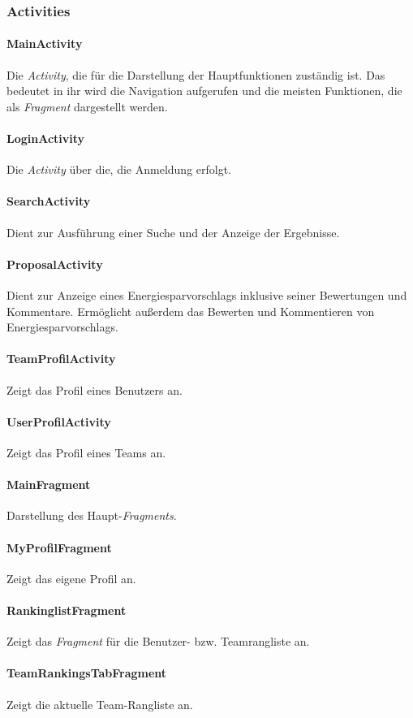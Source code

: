 \subsubsection{Activities}
\paragraph{MainActivity} Die \emph{Activity}, die für die Darstellung der Hauptfunktionen zuständig ist. Das bedeutet in ihr wird die Navigation aufgerufen und die meisten Funktionen, die als \emph{Fragment} dargestellt werden.
\paragraph{LoginActivity} Die \emph{Activity} über die, die Anmeldung erfolgt.
\paragraph{SearchActivity} Dient zur Ausführung einer Suche und der Anzeige der Ergebnisse.
\paragraph{ProposalActivity} Dient zur Anzeige eines Energiesparvorschlags inklusive seiner Bewertungen und Kommentare. Ermöglicht außerdem das Bewerten und Kommentieren von Energiesparvorschlags.
\paragraph{TeamProfilActivity} Zeigt das Profil eines Benutzers an.
\paragraph{UserProfilActivity} Zeigt das Profil eines Teams an.
\paragraph{MainFragment} Darstellung des Haupt-\emph{Fragments}.
\paragraph{MyProfilFragment} Zeigt das eigene Profil an.
\paragraph{RankinglistFragment} Zeigt das \emph{Fragment} für die Benutzer- bzw. Teamrangliste an.
\paragraph{TeamRankingsTabFragment} Zeigt die aktuelle Team-Rangliste an.
